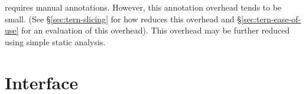 
 \tern requires manual annotations.  However, this
annotation overhead tends to be small.  (See \S\ref{sec:tern-slicing} for how
\tern reduces this overhead and \S\ref{sec:tern-ease-of-use} for an evaluation
of this overhead).  This overhead may be further reduced using simple static
analysis.



\section{Interface}  \label{sec:tern-annotations}

